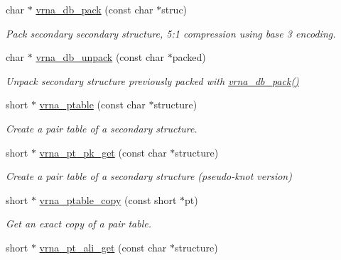 \begin{DoxyCompactItemize}
char $\ast$ \hyperlink{group__struct__utils_ga55c4783060a1464f862f858d5599c9e1}{vrna\+\_\+db\+\_\+pack} (const char $\ast$struc)
\begin{DoxyCompactList}\small\item\em Pack secondary secondary structure, 5\+:1 compression using base 3 encoding. \end{DoxyCompactList}\item 
char $\ast$ \hyperlink{group__struct__utils_ga6490adff857d84ce06e6f379ae3a4512}{vrna\+\_\+db\+\_\+unpack} (const char $\ast$packed)
\begin{DoxyCompactList}\small\item\em Unpack secondary structure previously packed with \hyperlink{group__struct__utils_ga55c4783060a1464f862f858d5599c9e1}{vrna\+\_\+db\+\_\+pack()} \end{DoxyCompactList}\item 
short $\ast$ \hyperlink{group__struct__utils_gae829fb8bb7f694c12a9c0bbc34c77c60}{vrna\+\_\+ptable} (const char $\ast$structure)
\begin{DoxyCompactList}\small\item\em Create a pair table of a secondary structure. \end{DoxyCompactList}\item 
short $\ast$ \hyperlink{group__struct__utils_gacca520048b24ec5a8978f4dafb4e4bf8}{vrna\+\_\+pt\+\_\+pk\+\_\+get} (const char $\ast$structure)
\begin{DoxyCompactList}\small\item\em Create a pair table of a secondary structure (pseudo-\/knot version) \end{DoxyCompactList}\item 
short $\ast$ \hyperlink{group__struct__utils_ga2daefbbd6d9f8803731651882f54332d}{vrna\+\_\+ptable\+\_\+copy} (const short $\ast$pt)
\begin{DoxyCompactList}\small\item\em Get an exact copy of a pair table. \end{DoxyCompactList}\item 
short $\ast$ \hyperlink{group__struct__utils_ga1ee4cdcda1f57d32dcb38032116d335d}{vrna\+\_\+pt\+\_\+ali\+\_\+get} (const char $\ast$structure)\hypertarget{group__struct__utils_ga1ee4cdcda1f57d32dcb38032116d335d}{}\label{group__struct__utils_ga1ee4cdcda1f57d32dcb38032116d335d}


\end{DoxyCompactItemize}
